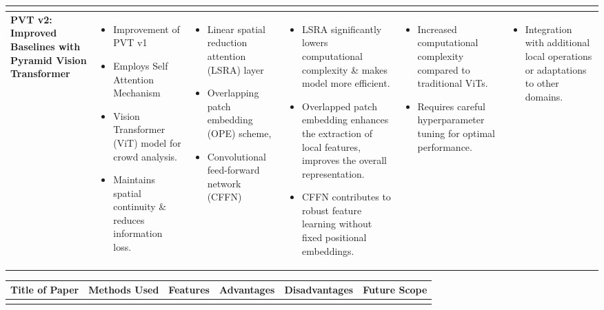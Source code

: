 \documentclass{article}
\begin{document}
\begin{adjustbox}{width=\textwidth}
\begin{tabular}{|p{}|p{}|p{}|p{}|p{}|p{}|}
\begin{itemize}[leftmargin=*]
    \end{itemize} \\
    \hline
    \vspace{0.1in}
    \large \textbf{PVT v2: Improved Baselines with Pyramid Vision Transformer }& 
    \begin{itemize}[leftmargin=*]
        \item Improvement of PVT v1 
        \item Employs Self Attention Mechanism
        \item Vision Transformer (ViT) model for crowd analysis. 
        \item Maintains spatial continuity \& reduces information loss.
    \end{itemize} & 
    \begin{itemize}[leftmargin=*]
         \item Linear spatial reduction attention (LSRA) layer
         \item Overlapping patch embedding (OPE) scheme, 
         \item Convolutional feed-forward network (CFFN)
    \end{itemize} & 
    \begin{itemize}[leftmargin=*]
        \item LSRA significantly lowers computational complexity \& makes model more efficient.
        \item Overlapped patch embedding enhances the extraction of local features, improves the overall representation.
        \item CFFN contributes to robust feature learning without fixed positional embeddings.
    \end{itemize} & 
    \begin{itemize}[leftmargin=*]
        \item Increased computational complexity compared to traditional ViTs.
        \item Requires careful hyperparameter tuning for optimal performance.
    \end{itemize} & 
    \begin{itemize}[leftmargin=*]
        \item Integration with additional local operations or adaptations to other domains.
    \end{itemize} \\
     \hline
\end{tabular}
\newpage

\begin{tabular}{|p{}|p{}|p{}|p{}|p{}|p{}|}
    \hline
    \rowcolor[HTML]{D3D3D3}
    \textbf{Title of Paper} & \textbf{Methods Used} & \textbf{Features} & \textbf{Advantages} & \textbf{Disadvantages} &  \textbf{Future Scope} \\
      \hline
       \vspace{0.1in}
   

\end{tabular}
\end{adjustbox}
\end{document}
